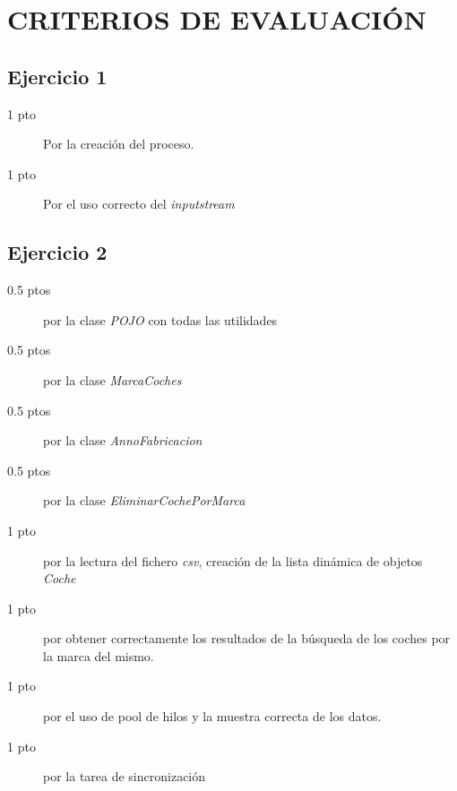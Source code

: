 \documentclass[addpoints]{exam}
\begin{document}
\section{CRITERIOS DE EVALUACIÓN}




\subsection{Ejercicio 1} 
\begin{description}
\item[1 pto] Por la creación del proceso.
\item[1 pto] Por el uso correcto del \emph{inputstream}
\end{description}
\subsection{Ejercicio 2}
\begin{description}
\item[0.5 ptos] por la clase \emph{POJO} con todas las utilidades
\item[0.5 ptos] por la clase \emph{MarcaCoches}
\item[0.5 ptos] por la clase \emph{AnnoFabricacion}
\item[0.5 ptos] por la clase \emph{EliminarCochePorMarca}
\item[1 pto] por la lectura del fichero \emph{csv}, creación de la lista dinámica de objetos \emph{Coche}
\item[1 pto] por obtener correctamente los resultados de la búsqueda de los coches por la marca del mismo.
\item[1 pto] por el uso de pool de hilos y la muestra correcta de los datos.
\item[1 pto] por la tarea de sincronización

\end{description}
\end{document}
